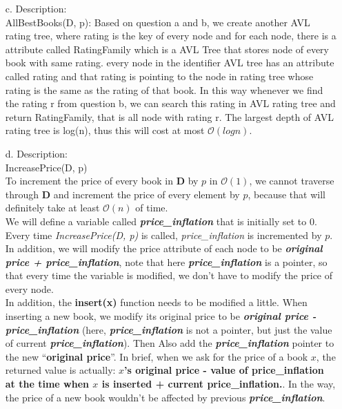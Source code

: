 \documentclass[10pt]{article}
\begin{document}
\begin{enumerate}
\item[c.]Description:\\
AllBestBooks(D, p): Based on question a and b, we create another AVL rating tree, where rating is the key of every node and for each node, there is a attribute called RatingFamily which is a AVL Tree that stores node of every book with same rating. every node in the identifier AVL tree has an attribute called rating and that rating is pointing to the node in rating tree whose rating is the same as the rating of that book. In this way whenever we find the rating r from question b, we can search this rating in AVL rating tree and return RatingFamily, that is all node with rating r. The largest depth of AVL rating tree is log(n), thus this will cost at most $\mathcal{O}(logn)$. 

\item[d.] Description:\\
IncreasePrice(D, p)\\
To increment the price of every book in \textbf{D} by $p$ in $\mathcal{O}(1)$, we cannot traverse through \textbf{D} and increment the price of every element by $p$, because that will definitely take at least $\mathcal{O}(n)$ of time.\\
We will define a variable called \textbf{\textit{price\_inflation}} that is initially set to 0.\\
Every time \textit{IncreasePrice(D, p)} is called, \textit{price\_inflation} is incremented by $p$.\\
In addition, we will modify the price attribute of each node to be \textbf{\textit{original price + price\_inflation}},
note that here \textbf{\textit{price\_inflation}} is a pointer, so that every time the variable is modified, we don't have to modify the price of every node.\\
In addition, the \textbf{insert(x)} function needs to be modified a little. When inserting a new book, we modify its original price to be \textit{\textbf{original price - price\_inflation}} (here, \textit{\textbf{price\_inflation}} is not a pointer, but just the value of current \textit{\textbf{price\_inflation}}). Then Also add the \textbf{\textit{price\_inflation}} pointer to the new ``\textbf{original price}''. In brief, when we ask for the price of a book $x$, the returned value is actually: \textbf{$x$'s original price - value of price\_inflation at the time when $x$ is inserted + current price\_inflation.}. In the way, the price of a new book wouldn't be affected by previous \textit{\textbf{price\_inflation}}.


\end{enumerate}
\end{document}
